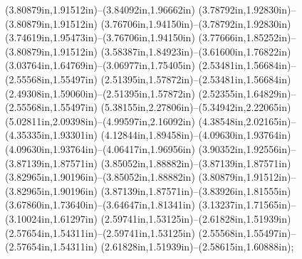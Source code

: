 (3.80879in,1.91512in)--(3.84092in,1.96662in) (3.78792in,1.92830in)--(3.80879in,1.91512in) (3.76706in,1.94150in)--(3.78792in,1.92830in) (3.74619in,1.95473in)--(3.76706in,1.94150in) (3.77666in,1.85252in)--(3.80879in,1.91512in) (3.58387in,1.84923in)--(3.61600in,1.76822in) (3.03764in,1.64769in)--(3.06977in,1.75405in) (2.53481in,1.56684in)--(2.55568in,1.55497in) (2.51395in,1.57872in)--(2.53481in,1.56684in) (2.49308in,1.59060in)--(2.51395in,1.57872in) (2.52355in,1.64829in)--(2.55568in,1.55497in) (5.38155in,2.27806in)--(5.34942in,2.22065in) (5.02811in,2.09398in)--(4.99597in,2.16092in) (4.38548in,2.02165in)--(4.35335in,1.93301in) (4.12844in,1.89458in)--(4.09630in,1.93764in) (4.09630in,1.93764in)--(4.06417in,1.96956in) (3.90352in,1.92556in)--(3.87139in,1.87571in) (3.85052in,1.88882in)--(3.87139in,1.87571in) (3.82965in,1.90196in)--(3.85052in,1.88882in) (3.80879in,1.91512in)--(3.82965in,1.90196in) (3.87139in,1.87571in)--(3.83926in,1.81555in) (3.67860in,1.73640in)--(3.64647in,1.81341in) (3.13237in,1.71565in)--(3.10024in,1.61297in) (2.59741in,1.53125in)--(2.61828in,1.51939in) (2.57654in,1.54311in)--(2.59741in,1.53125in) (2.55568in,1.55497in)--(2.57654in,1.54311in) (2.61828in,1.51939in)--(2.58615in,1.60888in);
